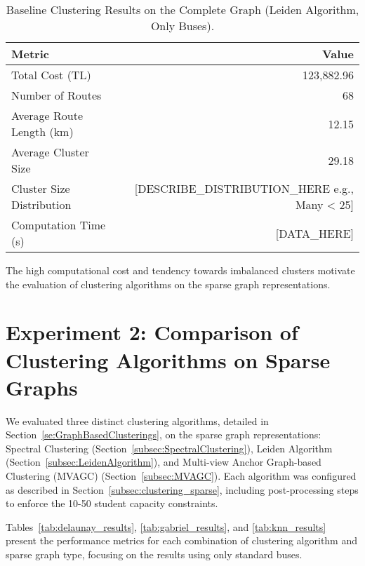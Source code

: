 \begin{table}[h]
\centering
\label{tab:complete_graph_clustering}
\begin{tabular}{lr}
\toprule
Metric & Value \\
\midrule
Total Cost (TL) & 123,882.96 \\
Number of Routes & 68 \\
Average Route Length (km) & 12.15 \\
Average Cluster Size & 29.18 \\
Cluster Size Distribution & [DESCRIBE_DISTRIBUTION_HERE e.g., Many < 25] \\
Computation Time (s) & [DATA_HERE] \\
\bottomrule
\end{tabular}
\caption{Baseline Clustering Results on the Complete Graph (Leiden Algorithm, Only Buses).}
\end{table}

The high computational cost and tendency towards imbalanced clusters motivate the evaluation of clustering algorithms on the sparse graph representations.

\section{Experiment 2: Comparison of Clustering Algorithms on Sparse Graphs}
\label{sec:exp_clustering}

We evaluated three distinct clustering algorithms, detailed in Section~\ref{se:GraphBasedClusterings}, on the sparse graph representations: Spectral Clustering (Section~\ref{subsec:SpectralClustering}), Leiden Algorithm (Section~\ref{subsec:LeidenAlgorithm}), and Multi-view Anchor Graph-based Clustering (MVAGC) (Section~\ref{subsec:MVAGC}). Each algorithm was configured as described in Section~\ref{subsec:clustering_sparse}, including post-processing steps to enforce the 10-50 student capacity constraints.

Tables~\ref{tab:delaunay_results}, \ref{tab:gabriel_results}, and \ref{tab:knn_results} present the performance metrics for each combination of clustering algorithm and sparse graph type, focusing on the results using only standard buses.

